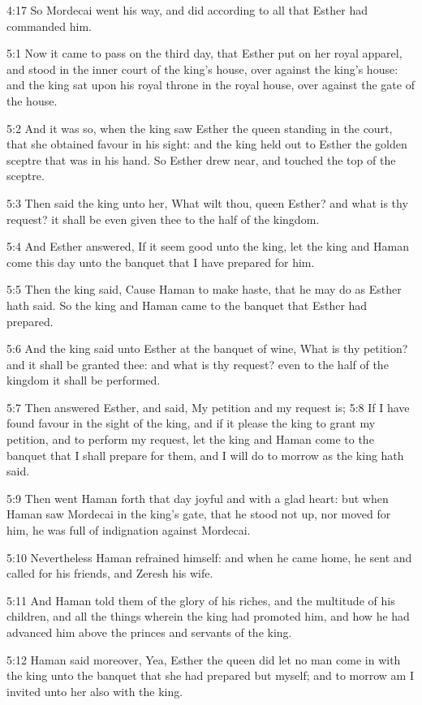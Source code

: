 4:17 So Mordecai went his way, and did according to all that Esther had commanded him.

5:1 Now it came to pass on the third day, that Esther put on her royal apparel, and stood in the inner court of the king's house, over against the king's house: and the king sat upon his royal throne in the royal house, over against the gate of the house.

5:2 And it was so, when the king saw Esther the queen standing in the court, that she obtained favour in his sight: and the king held out to Esther the golden sceptre that was in his hand. So Esther drew near, and touched the top of the sceptre.

5:3 Then said the king unto her, What wilt thou, queen Esther? and what is thy request? it shall be even given thee to the half of the kingdom.

5:4 And Esther answered, If it seem good unto the king, let the king and Haman come this day unto the banquet that I have prepared for him.

5:5 Then the king said, Cause Haman to make haste, that he may do as Esther hath said. So the king and Haman came to the banquet that Esther had prepared.

5:6 And the king said unto Esther at the banquet of wine, What is thy petition? and it shall be granted thee: and what is thy request? even to the half of the kingdom it shall be performed.

5:7 Then answered Esther, and said, My petition and my request is; 5:8 If I have found favour in the sight of the king, and if it please the king to grant my petition, and to perform my request, let the king and Haman come to the banquet that I shall prepare for them, and I will do to morrow as the king hath said.

5:9 Then went Haman forth that day joyful and with a glad heart: but when Haman saw Mordecai in the king's gate, that he stood not up, nor moved for him, he was full of indignation against Mordecai.

5:10 Nevertheless Haman refrained himself: and when he came home, he sent and called for his friends, and Zeresh his wife.

5:11 And Haman told them of the glory of his riches, and the multitude of his children, and all the things wherein the king had promoted him, and how he had advanced him above the princes and servants of the king.

5:12 Haman said moreover, Yea, Esther the queen did let no man come in with the king unto the banquet that she had prepared but myself; and to morrow am I invited unto her also with the king.

